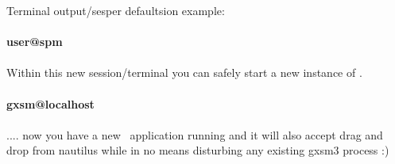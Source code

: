 Terminal output/sesper defaultsion example:\\ \\
\textbf{user@spm}\\ \\
Within this new session/terminal you can safely start a new instance of \Gxsm .\\ \\
\textbf{gxsm@localhost}\\ \\
.... now you have a new \Gxsm\ application running and it will also accept drag and drop from nautilus while in no means disturbing any existing gxsm3 process :)
